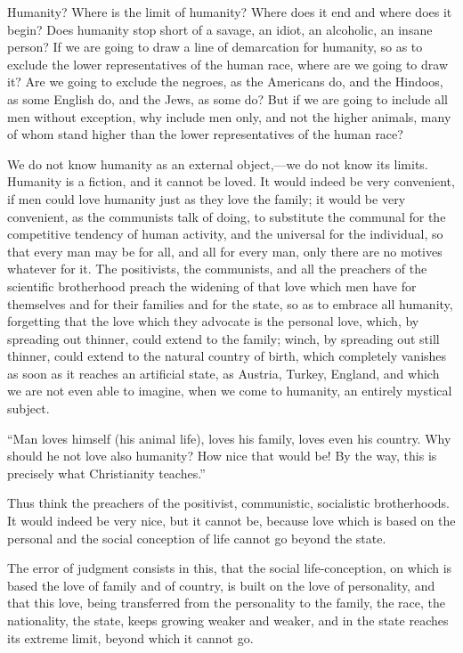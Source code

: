 \documentclass{book}
\begin{document}
Humanity? Where is the limit of humanity? Where does it end and where does it begin? Does humanity stop short of a savage, an idiot, an alcoholic, an insane person? If we are going to draw a line of demarcation for humanity, so as to exclude the lower representatives of the human race, where are we going to draw it? Are we going to exclude the negroes, as the Americans do, and the Hindoos, as some English do, and the Jews, as some do? But if we are going to include all men without exception, why include men only, and not the higher animals, many of whom stand higher than the lower representatives of the human race?

We do not know humanity as an external object,—we do not know its limits. Humanity is a fiction, and it cannot be loved. It would indeed be very convenient, if men could love humanity just as they love the family; it would be very convenient, as the communists talk of doing, to substitute the communal for the competitive tendency of human activity, and the universal for the individual, so that every man may be for all, and all for every man, only there are no motives whatever for it. The positivists, the communists, and all the preachers of the scientific brotherhood preach the widening of that love which men have for themselves and for their families and for the state, so as to embrace all humanity, forgetting that the love which they advocate is the personal love, which, by spreading out thinner, could extend to the family; winch, by spreading out still thinner, could extend to the natural country of birth, which completely vanishes as soon as it reaches an artificial state, as Austria, Turkey, England, and which we are not even able to imagine, when we come to humanity, an entirely mystical subject.

“Man loves himself (his animal life), loves his family, loves even his country. Why should he not love also humanity? How nice that would be! By the way, this is precisely what Christianity teaches.”

Thus think the preachers of the positivist, communistic, socialistic brotherhoods. It would indeed be very nice, but it cannot be, because love which is based on the personal and the social conception of life cannot go beyond the state.

The error of judgment consists in this, that the social life-conception, on which is based the love of family and of country, is built on the love of personality, and that this love, being transferred from the personality to the family, the race, the nationality, the state, keeps growing weaker and weaker, and in the state reaches its extreme limit, beyond which it cannot go.
\end{document}
